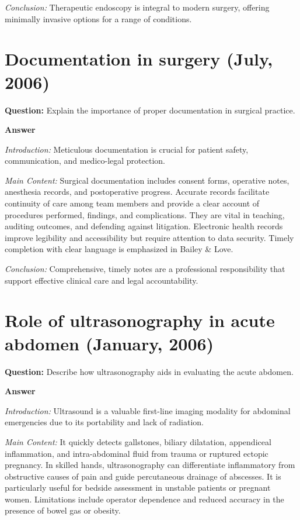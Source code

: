 \documentclass{article}
\begin{document}
\emph{Conclusion:} Therapeutic endoscopy is integral to modern surgery, offering minimally invasive options for a range of conditions.


\section{Documentation in surgery (July, 2006)}


\textbf{Question:} Explain the importance of proper documentation in surgical practice.

\textbf{Answer}

\emph{Introduction:} Meticulous documentation is crucial for patient safety, communication, and medico-legal protection.

\emph{Main Content:} Surgical documentation includes consent forms, operative notes, anesthesia records, and postoperative progress. Accurate records facilitate continuity of care among team members and provide a clear account of procedures performed, findings, and complications. They are vital in teaching, auditing outcomes, and defending against litigation. Electronic health records improve legibility and accessibility but require attention to data security. Timely completion with clear language is emphasized in Bailey \& Love.

\emph{Conclusion:} Comprehensive, timely notes are a professional responsibility that support effective clinical care and legal accountability.


\section{Role of ultrasonography in acute abdomen (January, 2006)}


\textbf{Question:} Describe how ultrasonography aids in evaluating the acute abdomen.

\textbf{Answer}

\emph{Introduction:} Ultrasound is a valuable first-line imaging modality for abdominal emergencies due to its portability and lack of radiation.

\emph{Main Content:} It quickly detects gallstones, biliary dilatation, appendiceal inflammation, and intra-abdominal fluid from trauma or ruptured ectopic pregnancy. In skilled hands, ultrasonography can differentiate inflammatory from obstructive causes of pain and guide percutaneous drainage of abscesses. It is particularly useful for bedside assessment in unstable patients or pregnant women. Limitations include operator dependence and reduced accuracy in the presence of bowel gas or obesity.
\end{document}
